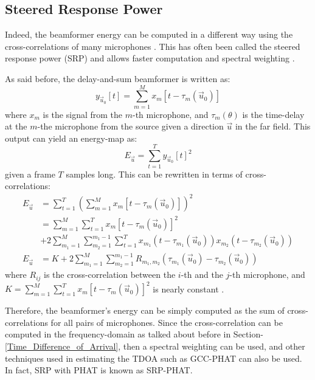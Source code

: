 \documentclass[notitlepage]{report}
\begin{document}
\subsection{Steered Response Power}

Indeed, the beamformer energy can be computed in a different way using the cross-correlations of many microphones \cite{valin_localization_2004} \cite{valin_robust_2007} \cite{argentieri_survey_2015} \cite{rascon_localization_2017}. This has often been called the steered response power (SRP) and allows faster computation and spectral weighting \cite{badali_evaluating_2009}. 

As said before, the delay-and-sum beamformer is written as:
\begin{equation}
y_{\vec{u}_0}[t] = \sum_{m=1}^M x_m[t-\tau_m(\vec{u}_0)] 
\end{equation}
where $x_m$ is the signal from the $m$-th microphone, and $\tau_m(\theta)$ is the time-delay at the $m$-the microphone from the source given a direction $\vec{u}$ in the far field. This output can yield an energy-map as:
\begin{equation}
E_{\vec{u}} = \sum_{t=1}^T y_{\vec{u}_0}[t]^2
\end{equation}
given a frame $T$ samples long. This can be rewritten in terms of cross-correlations:
\begin{equation}
\begin{split}
E_{\vec{u}} &= \sum_{t=1}^T \left( \sum_{m=1}^M x_m[t-\tau_m(\vec{u}_0)] \right)^2 \\
&= \sum_{m=1}^{M} \sum_{t=1}^T x_m[t - \tau_m(\vec{u}_0)]^2 \\
&+ 2 \sum_{m_1=1}^M \sum_{m_2=1}^{m_1-1} 
\sum_{t=1}^T x_{m_1}\left(t - \tau_{m_1}(\vec{u}_0)\right) x_{m_2}\left(t - \tau_{m_2}(\vec{u}_0)\right) \\
E_{\vec{u}} &= K 
+ 2 \sum_{m_1=1}^M \sum_{m_2=1}^{m_1-1} R_{m_1,m_2} (\tau_{m_1}(\vec{u}_0) - \tau_{m_2}(\vec{u}_0))
\end{split}
\end{equation}
where $R_{ij}$ is the cross-correlation between the $i$-th and the $j$-th microphone, and $K = \sum_{m=1}^{M} \sum_{t=1}^T x_m[t - \tau_m(\vec{u}_0)]^2$ is nearly constant \cite{valin_localization_2004} \cite{valin_robust_2007}. 

Therefore, the beamformer's energy can be simply computed as the sum of cross-correlations for all pairs of microphones. Since the cross-correlation can be computed in the frequency-domain as talked about before in Section-\ref{Time_Difference_of_Arrival}, then a spectral weighting can be used, and other techniques used in estimating the TDOA such as GCC-PHAT can also be used. In fact, SRP with PHAT is known as SRP-PHAT.
\end{document}
